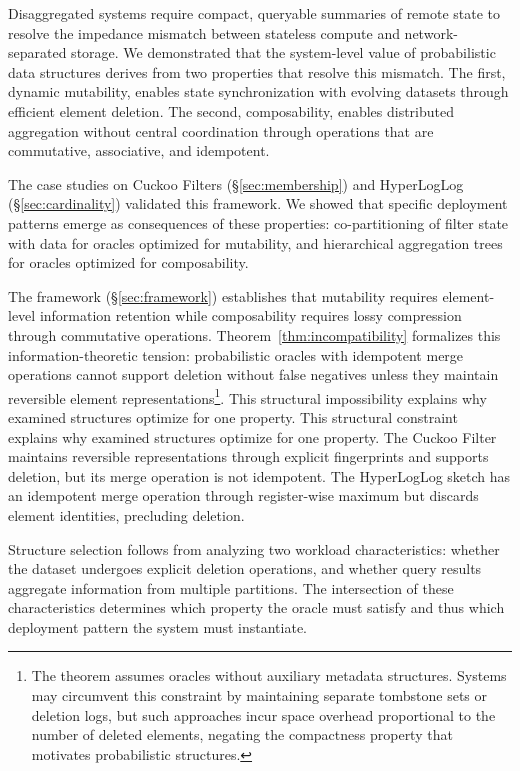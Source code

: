 Disaggregated systems require compact, queryable summaries of remote state to resolve the impedance mismatch between stateless compute and network-separated storage. We demonstrated that the system-level value of probabilistic data structures derives from two properties that resolve this mismatch. The first, dynamic mutability, enables state synchronization with evolving datasets through efficient element deletion. The second, composability, enables distributed aggregation without central coordination through operations that are commutative, associative, and idempotent.

The case studies on Cuckoo Filters (\S\ref{sec:membership}) and HyperLogLog (\S\ref{sec:cardinality}) validated this framework. We showed that specific deployment patterns emerge as consequences of these properties: co-partitioning of filter state with data for oracles optimized for mutability, and hierarchical aggregation trees for oracles optimized for composability.

The framework (\S\ref{sec:framework}) establishes that mutability requires element-level information retention while composability requires lossy compression through commutative operations. Theorem~\ref{thm:incompatibility} formalizes this information-theoretic tension: probabilistic oracles with idempotent merge operations cannot support deletion without false negatives unless they maintain reversible element representations\footnote{The theorem assumes oracles without auxiliary metadata structures. Systems may circumvent this constraint by maintaining separate tombstone sets or deletion logs, but such approaches incur space overhead proportional to the number of deleted elements, negating the compactness property that motivates probabilistic structures.}. This structural impossibility explains why examined structures optimize for one property. This structural constraint explains why examined structures optimize for one property. The Cuckoo Filter maintains reversible representations through explicit fingerprints and supports deletion, but its merge operation is not idempotent. The HyperLogLog sketch has an idempotent merge operation through register-wise maximum but discards element identities, precluding deletion.

Structure selection follows from analyzing two workload characteristics: whether the dataset undergoes explicit deletion operations, and whether query results aggregate information from multiple partitions. The intersection of these characteristics determines which property the oracle must satisfy and thus which deployment pattern the system must instantiate.


